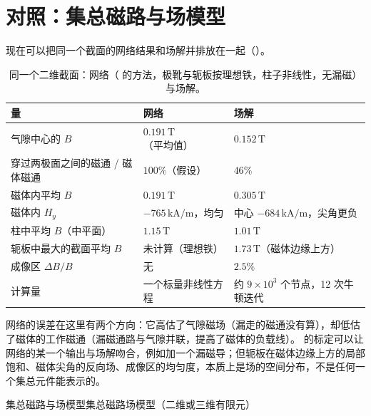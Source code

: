 \section{对照：集总磁路与场模型}\label{sec:magnets-compare}

现在可以把同一个截面的网络结果和场解并排放在一起（）。

\begin{table}[htbp]\centering\small
\caption{同一个二维截面：网络（ 的方法，极靴与轭板按理想铁，柱子非线性，无漏磁）与场解。}\label{tab:magnets-network-field}
\begin{tabularx}{\linewidth}{@{}Y >{\raggedright\arraybackslash}p{.27\linewidth} >{\raggedright\arraybackslash}p{.3\linewidth}@{}}
\toprule
量 & 网络 & 场解\\\midrule
气隙中心的 $B$ & $0.191\,\mathrm T$（平均值） & $0.152\,\mathrm T$\\
穿过两极面之间的磁通 / 磁体磁通 & $100\%$（假设） & $46\%$\\
磁体内平均 $B$ & $0.191\,\mathrm T$ & $0.305\,\mathrm T$\\
磁体内 $H_y$ & $-765\,\mathrm{kA/m}$，均匀 & 中心 $-684\,\mathrm{kA/m}$，尖角更负\\
柱中平均 $B$（中平面） & $1.15\,\mathrm T$ & $1.01\,\mathrm T$\\
轭板中最大的截面平均 $B$ & 未计算（理想铁） & $1.73\,\mathrm T$（磁体边缘上方）\\
成像区 $\Delta B/B$ & 无 & $2.5\%$\\
计算量 & 一个标量非线性方程 & 约 $9\times10^3$ 个节点，12 次牛顿迭代\\
\bottomrule
\end{tabularx}
\end{table}

网络的误差在这里有两个方向：它高估了气隙磁场（漏走的磁通没有算），却低估了磁体的工作磁通（漏磁通路与气隙并联，提高了磁体的负载线）。 的标定可以让网络的某一个输出与场解吻合，例如加一个漏磁导；但轭板在磁体边缘上方的局部饱和、磁体尖角的反向场、成像区的均匀度，本质上是场的空间分布，不是任何一个集总元件能表示的。

\begin{compare}{集总磁路与场模型}{集总磁路}{场模型（二维或三维有限元）}
\end{compare}

